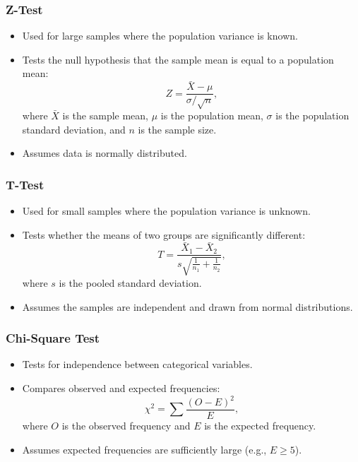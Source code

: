 \documentclass[12pt,a4paper]{article}
\begin{document}
\subsubsection{Z-Test}
\begin{itemize}
    \item Used for large samples where the population variance is known.
    \item Tests the null hypothesis that the sample mean is equal to a population mean:
    \[ Z = \frac{\bar{X} - \mu}{\sigma / \sqrt{n}}, \]
    where $\bar{X}$ is the sample mean, $\mu$ is the population mean, $\sigma$ is the population standard deviation, and $n$ is the sample size.
    \item Assumes data is normally distributed.
\end{itemize}

\subsubsection{T-Test}
\begin{itemize}
    \item Used for small samples where the population variance is unknown.
    \item Tests whether the means of two groups are significantly different:
    \[ T = \frac{\bar{X}_1 - \bar{X}_2}{s \sqrt{\frac{1}{n_1} + \frac{1}{n_2}}}, \]
    where $s$ is the pooled standard deviation.
    \item Assumes the samples are independent and drawn from normal distributions.
\end{itemize}

\subsubsection{Chi-Square Test}
\begin{itemize}
    \item Tests for independence between categorical variables.
    \item Compares observed and expected frequencies:
    \[ \chi^2 = \sum \frac{(O - E)^2}{E}, \]
    where $O$ is the observed frequency and $E$ is the expected frequency.
    \item Assumes expected frequencies are sufficiently large (e.g., $E \geq 5$).
\end{itemize}
\end{document}
